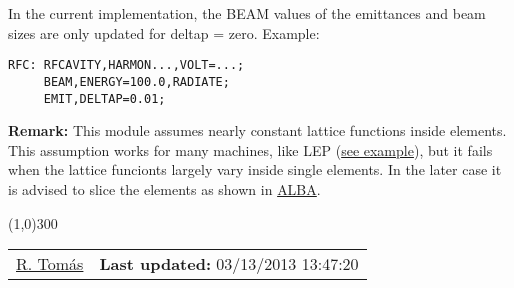   In the current implementation, the BEAM values of the emittances and beam sizes are only updated for deltap = zero. Example: 
\begin{verbatim}
RFC: RFCAVITY,HARMON...,VOLT=...;
     BEAM,ENERGY=100.0,RADIATE;
     EMIT,DELTAP=0.01;
\end{verbatim}\textbf{Remark:}  This module assumes nearly constant lattice functions inside elements. This assumption works for many machines,  like LEP (\href{http://cern.ch/frs/mad-X_examples/emit/LEP/}{see example}), but it fails when the lattice funcionts largely vary inside single elements. In the later case it is advised to slice the elements as shown in     \href{http://cern.ch/frs/mad-X_examples/emit/ALBA/}{ALBA}.   

\line(1,0){300}

\begin{tabular}{lr}
\href{Rogelio HREF=http://consult.cern.ch/xwho/people/69118}{R. Tom\'as} & \textbf{Last updated:} 03/13/2013 13:47:20
% 

\end{tabular}

